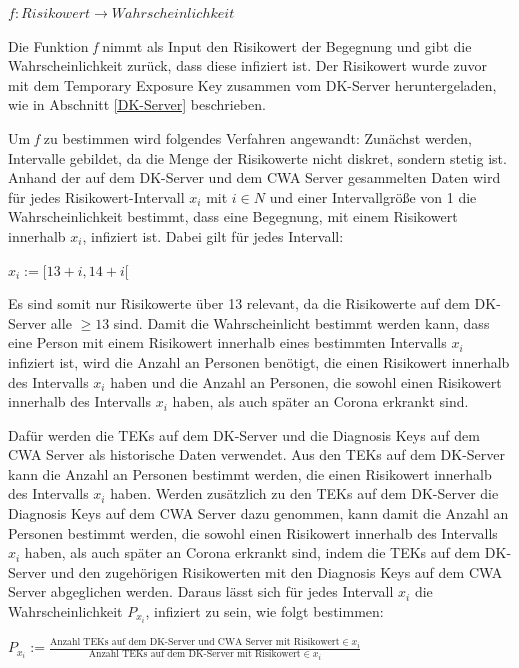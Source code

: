 \documentclass[conference,compsoc]{IEEEtran}
\begin{document}
\centerline{\text{ }}
\centerline{$f: Risikowert \rightarrow Wahrscheinlichkeit$}
\centerline{\text{ }}

Die Funktion \textit{f} nimmt als Input den Risikowert der Begegnung und gibt die Wahrscheinlichkeit zurück, dass diese infiziert ist.
Der Risikowert wurde zuvor mit dem Temporary Exposure Key zusammen vom DK-Server heruntergeladen, wie in Abschnitt \ref{DK-Server} beschrieben.

Um \textit{f} zu bestimmen wird folgendes Verfahren angewandt:
Zunächst werden, Intervalle gebildet, da die Menge der Risikowerte nicht diskret, sondern stetig ist.
Anhand der auf dem DK-Server und dem CWA Server gesammelten Daten wird für jedes Risikowert-Intervall $x_i$ mit $i \in N$ und einer Intervallgröße von 1 die Wahrscheinlichkeit bestimmt, 
dass eine Begegnung, mit einem Risikowert innerhalb $x_i$, infiziert ist. Dabei gilt für jedes Intervall:

\centerline{\text{ }}
\centerline{$x_i := [13+i, 14+i[$}
\centerline{\text{ }}

Es sind somit nur Risikowerte über 13 relevant, da die Risikowerte auf dem DK-Server alle $\geq 13$ sind.
Damit die Wahrscheinlicht bestimmt werden kann, dass eine Person mit einem Risikowert innerhalb eines bestimmten Intervalls $x_i$ infiziert ist, 
wird die Anzahl an Personen benötigt, die einen Risikowert innerhalb des Intervalls $x_i$ haben und die Anzahl an Personen, 
die sowohl einen Risikowert innerhalb des Intervalls $x_i$ haben, als auch später an Corona erkrankt sind. 

Dafür werden die TEKs auf dem DK-Server und die Diagnosis Keys auf dem CWA Server als historische Daten verwendet.
Aus den TEKs auf dem DK-Server kann die Anzahl an Personen bestimmt werden,
die einen Risikowert innerhalb des Intervalls $x_i$ haben.
Werden zusätzlich zu den TEKs auf dem DK-Server die Diagnosis Keys auf dem CWA Server dazu genommen, 
kann damit die Anzahl an Personen bestimmt werden, die sowohl einen Risikowert innerhalb des Intervalls $x_i$ haben, als auch später an Corona erkrankt sind, 
indem die TEKs auf dem DK-Server und den zugehörigen Risikowerten mit den Diagnosis Keys auf dem CWA Server abgeglichen werden. 
Daraus lässt sich für jedes Intervall $x_i$ die Wahrscheinlichkeit $P_{x_i}$, infiziert zu sein, wie folgt bestimmen:

\centerline{\text{ }}
\centerline{$P_{x_i} := \frac{\text{Anzahl TEKs auf dem DK-Server und CWA Server mit Risikowert} \in x_i}{\text{Anzahl TEKs auf dem DK-Server mit Risikowert} \in x_i}$}
\centerline{\text{ }}
\end{document}
